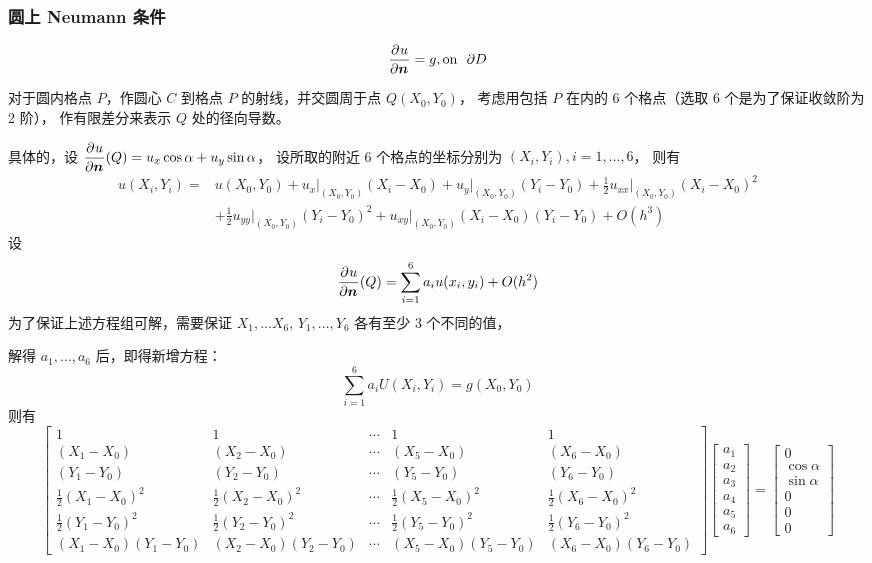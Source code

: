 \documentclass[lang=cn,a4paper,newtx,bibend=bibtex]{elegantpaper}
\begin{document}
\subsubsection{圆上 Neumann 条件}\label{ysnm}

\[ \dfrac{\partial^{}{u}}{\partial {\bm{n}}^{}} = g, \text{on~~} \partial D\]

对于圆内格点 $P$，作圆心 $C$ 到格点 $P$ 的射线，并交圆周于点 $Q(X_0, Y_0)$，
考虑用包括 $P$ 在内的 6 个格点（选取 $6$ 个是为了保证收敛阶为 2 阶），
作有限差分来表示 $Q$ 处的径向导数。

具体的，设 $\dfrac{\partial^{}{u}}{\partial {\bm{n}}^{}} (Q) = u_x \cos \alpha + u_y \sin \alpha$，
设所取的附近 6 个格点的坐标分别为 $(X_i, Y_i), i = 1, \dots, 6$，
则有
\begin{equation*}
\begin{aligned}
  u(X_i, Y_i) = &u(X_0, Y_0) + u_x\big|_{(X_0, Y_0)}(X_i - X_0) + u_y\big|_{(X_0, Y_0)}(Y_i - Y_0) +\frac12 u_{xx}\big|_{(X_0, Y_0)} (X_i - X_0)^2 \\
                &+ \frac12 u_{yy}\big|_{(X_0, Y_0)} (Y_i - Y_0)^2 + u_{xy}\big|_{(X_0, Y_0)} (X_i - X_0)(Y_i - Y_0) + O(h^3)
\end{aligned}
\end{equation*}
设
\[
  \dfrac{\partial^{}{u}}{\partial {\bm{n}}^{}} (Q) = \sum_{i = 1}^6 a_i u(x_i, y_i) + O(h^2)
\]
为了保证上述方程组可解，需要保证 $X_1, \dots X_6$, $Y_1, \dots, Y_6$ 各有至少 3 个不同的值，

解得 $a_1, \dots, a_6$ 后，即得新增方程：
\[
\sum_{i = 1}^6 a_i U(X_i, Y_i) = g(X_0, Y_0)
\label{eq3}
\]
则有
\[
  \begin{bmatrix}
    1 & 1 & \cdots & 1 & 1 \\
    (X_1 - X_0) & (X_2 - X_0) & \cdots & (X_5 - X_0) & (X_6 - X_0) \\
    (Y_1 - Y_0) & (Y_2 - Y_0) & \cdots & (Y_5 - Y_0) & (Y_6 - Y_0) \\
    \frac12 (X_1 - X_0)^2 & \frac12 (X_2 - X_0)^2 & \cdots & \frac12 (X_5 - X_0)^2 & \frac12 (X_6 - X_0)^2 \\
    \frac12 (Y_1 - Y_0)^2 & \frac12 (Y_2 - Y_0)^2 & \cdots & \frac12 (Y_5 - Y_0)^2 & \frac12 (Y_6 - Y_0)^2 \\
    (X_1 - X_0)(Y_1 - Y_0) & (X_2 - X_0)(Y_2 - Y_0) & \cdots & (X_5 - X_0)(Y_5 - Y_0) & (X_6 - X_0)(Y_6 - Y_0)
  \end{bmatrix}
  \begin{bmatrix}
    a_1 \\ a_2 \\ a_3 \\ a_4 \\ a_5 \\ a_6
  \end{bmatrix}
  =
  \begin{bmatrix}
    0 \\ \cos \alpha \\ \sin \alpha \\ 0 \\ 0 \\ 0 
  \end{bmatrix}
\]
\end{document}
